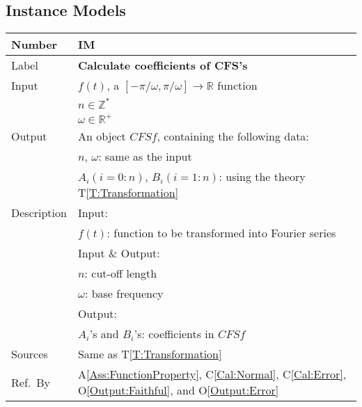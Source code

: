 \documentclass[12pt]{article}
\newcommand{\colAwidth}{0.13\textwidth}
\newcommand{\colBwidth}{0.82\textwidth}
\newcommand{\tref}[1]{T\ref{#1}}
\newcommand{\aref}[1]{A\ref{#1}}
\newcommand{\calref}[1]{C\ref{#1}}
\newcommand{\oref}[1]{O\ref{#1}}
\newcounter{instnum} %
\begin{document}
\subsection{Instance Models}
\noindent
\begin{minipage}{\textwidth}
	\renewcommand*{\arraystretch}{1.5}
	\begin{tabular}{| p{\colAwidth} | p{\colBwidth}|}
		\hline
		\rowcolor[gray]{0.9}
		Number& IM{instnum}\theinstnum \label{IM:CFScoeff}\\
		\hline
		Label& \bf Calculate coefficients of CFS's\\
		\hline
		Input& $f(t)$, a $[-\pi/\omega, \pi/\omega]\rightarrow\mathbb{R}$ function\\
			& $n\in\mathbb{Z}^{*}$\\
			& $\omega\in\mathbb{R}^{+}$\\
		\hline
		Output& An object $\mathit{CFSf}$, containing the following data:\\
		&$n$, $\omega$: same as the input\\
		&$A_i (i=0:n)$, $B_i (i=1:n)$: using the theory \tref{T:Transformation}\\
		\hline
		Description&Input:\\
		&$f(t)$: function to be transformed into Fourier series\\
		&Input \& Output:\\
		& $n$: cut-off length\\
		& $\omega$: base frequency\\
		&Output:\\
		&$A_i$'s and $B_i$'s: coefficients in $\mathit{CFSf}$\\
		\hline
		Sources&Same as \tref{T:Transformation}		\\
		\hline
		Ref.\ By & \aref{Ass:FunctionProperty}, \calref{Cal:Normal}, \calref{Cal:Error},  \oref{Output:Faithful}, and \oref{Output:Error}\\
		\hline
	\end{tabular}
\end{minipage}\\
~\newline
\end{document}
